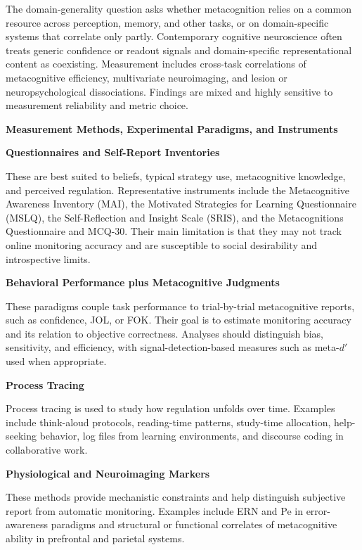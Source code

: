 \documentclass{book}
\providecommand{\ProjectDeepHeading}[2]{%
    \par\medskip\noindent\textbf{#2}\par\smallskip
}
\begin{document}
   The domain-generality question asks whether metacognition relies on a common resource across perception, memory, and other tasks, or on domain-specific systems that correlate only partly. Contemporary cognitive neuroscience often treats generic confidence or readout signals and domain-specific representational content as coexisting. Measurement includes cross-task correlations of metacognitive efficiency, multivariate neuroimaging, and lesion or neuropsychological dissociations. Findings are mixed and highly sensitive to measurement reliability and metric choice.

   \ProjectDeepHeading{5}{Measurement Methods, Experimental Paradigms, and Instruments}

   \ProjectDeepHeading{6}{Questionnaires and Self-Report Inventories}

   These are best suited to beliefs, typical strategy use, metacognitive knowledge, and perceived regulation. Representative instruments include the Metacognitive Awareness Inventory (MAI), the Motivated Strategies for Learning Questionnaire (MSLQ), the Self-Reflection and Insight Scale (SRIS), and the Metacognitions Questionnaire and MCQ-30. Their main limitation is that they may not track online monitoring accuracy and are susceptible to social desirability and introspective limits.

   \ProjectDeepHeading{6}{Behavioral Performance plus Metacognitive Judgments}

   These paradigms couple task performance to trial-by-trial metacognitive reports, such as confidence, JOL, or FOK. Their goal is to estimate monitoring accuracy and its relation to objective correctness. Analyses should distinguish bias, sensitivity, and efficiency, with signal-detection-based measures such as meta-$d'$ used when appropriate.

   \ProjectDeepHeading{6}{Process Tracing}

   Process tracing is used to study how regulation unfolds over time. Examples include think-aloud protocols, reading-time patterns, study-time allocation, help-seeking behavior, log files from learning environments, and discourse coding in collaborative work.

   \ProjectDeepHeading{6}{Physiological and Neuroimaging Markers}

   These methods provide mechanistic constraints and help distinguish subjective report from automatic monitoring. Examples include ERN and Pe in error-awareness paradigms and structural or functional correlates of metacognitive ability in prefrontal and parietal systems.
\end{document}
